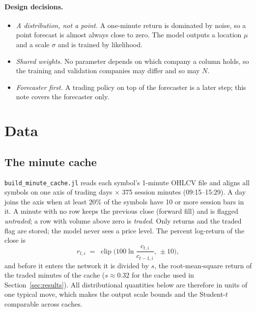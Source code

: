 \documentclass[11pt]{article}
\newcommand{\code}[1]{\texttt{#1}}
\DeclareMathOperator{\clip}{clip}
\begin{document}
\paragraph{Design decisions.}
\begin{itemize}
  \item \emph{A distribution, not a point.} A one-minute return is dominated by noise, so a point forecast is almost
        always close to zero. The model outputs a location $\mu$ and a scale $\sigma$ and is trained by likelihood.
  \item \emph{Shared weights.} No parameter depends on which company a column holds, so the training and validation
        companies may differ and so may $N$.
  \item \emph{Forecaster first.} A trading policy on top of the forecaster is a later step; this note covers the forecaster only.
\end{itemize}

\section{Data}\label{sec:data}

\subsection{The minute cache}

\code{build\_minute\_cache.jl} reads each symbol's 1-minute OHLCV file and aligns all symbols on one axis of
trading days $\times$ 375 session minutes (09:15--15:29). A day joins the axis when at least 20\% of the
symbols have 10 or more session bars in it. A minute with no row keeps the previous close (forward fill) and is flagged
\emph{untraded}; a row with volume above zero is \emph{traded}. Only returns and the traded flag are stored; the
model never sees a price level. The percent log-return of the close is
\begin{equation}
  r_{t,i} \;=\; \clip\!\Big(100\ln\frac{c_{t,i}}{c_{t-1,i}},\ \pm 10\Big),
\end{equation}
and before it enters the network it is divided by $s$, the root-mean-square return of the traded minutes of the cache
($s\approx 0.32$ for the cache used in Section~\ref{sec:results}). All distributional quantities below are therefore in units of one typical
move, which makes the output scale bounds and the Student-$t$ comparable across caches.
\end{document}
